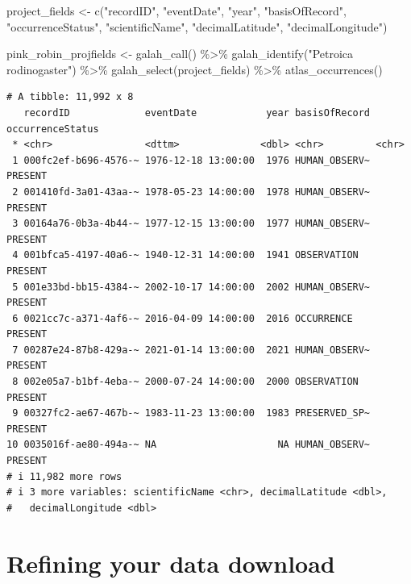 \documentclass[
  letterpaper,
  DIV=11,
  numbers=noendperiod,
  oneside]{scrreprt}
\newenvironment{Shaded}{\begin{snugshade}}{\end{snugshade}}
\newcommand{\FunctionTok}[1]{\textcolor[rgb]{0.28,0.35,0.67}{#1}}
\newcommand{\NormalTok}[1]{\textcolor[rgb]{0.00,0.23,0.31}{#1}}
\newcommand{\OtherTok}[1]{\textcolor[rgb]{0.00,0.23,0.31}{#1}}
\newcommand{\SpecialCharTok}[1]{\textcolor[rgb]{0.37,0.37,0.37}{#1}}
\newcommand{\StringTok}[1]{\textcolor[rgb]{0.13,0.47,0.30}{#1}}
\begin{document}
\begin{Shaded}
\begin{Highlighting}[]
\NormalTok{project\_fields }\OtherTok{\textless{}{-}} \FunctionTok{c}\NormalTok{(}\StringTok{"recordID"}\NormalTok{,}
                    \StringTok{"eventDate"}\NormalTok{,}
                    \StringTok{"year"}\NormalTok{, }
                    \StringTok{"basisOfRecord"}\NormalTok{, }
                    \StringTok{"occurrenceStatus"}\NormalTok{,}
                    \StringTok{"scientificName"}\NormalTok{,}
                    \StringTok{"decimalLatitude"}\NormalTok{,}
                    \StringTok{"decimalLongitude"}\NormalTok{)}

\NormalTok{pink\_robin\_projfields }\OtherTok{\textless{}{-}} \FunctionTok{galah\_call}\NormalTok{() }\SpecialCharTok{\%\textgreater{}\%} 
  \FunctionTok{galah\_identify}\NormalTok{(}\StringTok{"Petroica rodinogaster"}\NormalTok{) }\SpecialCharTok{\%\textgreater{}\%} 
  \FunctionTok{galah\_select}\NormalTok{(project\_fields) }\SpecialCharTok{\%\textgreater{}\%} 
  \FunctionTok{atlas\_occurrences}\NormalTok{()}
\end{Highlighting}
\end{Shaded}

\begin{verbatim}
# A tibble: 11,992 x 8
   recordID             eventDate            year basisOfRecord occurrenceStatus
 * <chr>                <dttm>              <dbl> <chr>         <chr>           
 1 000fc2ef-b696-4576-~ 1976-12-18 13:00:00  1976 HUMAN_OBSERV~ PRESENT         
 2 001410fd-3a01-43aa-~ 1978-05-23 14:00:00  1978 HUMAN_OBSERV~ PRESENT         
 3 00164a76-0b3a-4b44-~ 1977-12-15 13:00:00  1977 HUMAN_OBSERV~ PRESENT         
 4 001bfca5-4197-40a6-~ 1940-12-31 14:00:00  1941 OBSERVATION   PRESENT         
 5 001e33bd-bb15-4384-~ 2002-10-17 14:00:00  2002 HUMAN_OBSERV~ PRESENT         
 6 0021cc7c-a371-4af6-~ 2016-04-09 14:00:00  2016 OCCURRENCE    PRESENT         
 7 00287e24-87b8-429a-~ 2021-01-14 13:00:00  2021 HUMAN_OBSERV~ PRESENT         
 8 002e05a7-b1bf-4eba-~ 2000-07-24 14:00:00  2000 OBSERVATION   PRESENT         
 9 00327fc2-ae67-467b-~ 1983-11-23 13:00:00  1983 PRESERVED_SP~ PRESENT         
10 0035016f-ae80-494a-~ NA                     NA HUMAN_OBSERV~ PRESENT         
# i 11,982 more rows
# i 3 more variables: scientificName <chr>, decimalLatitude <dbl>,
#   decimalLongitude <dbl>
\end{verbatim}

\hypertarget{refining-your-data-download}{%
\section{Refining your data
download}\label{refining-your-data-download}}
\end{document}
